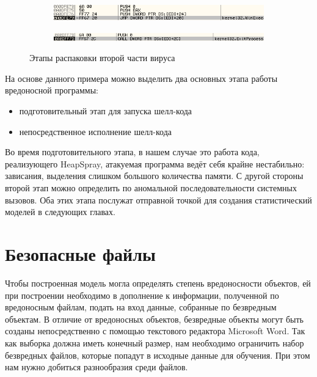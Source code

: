 \begin{figure}[ht]
\begin{subfigure}[h]{0.6\textwidth}
    \end{subfigure}        
    \begin{subfigure}[h]{0.6\textwidth}
    \centering
        \includegraphics[scale=0.7]{1.pdf/pasted-image-41.png}
        \caption{}
        
    \end{subfigure}         
    \begin{subfigure}[h]{0.6\textwidth}
    \centering
        \includegraphics[scale=0.7]{1.pdf/pasted-image-43.png}
        \caption{}
    \end{subfigure}
    \caption{Этапы распаковки второй части вируса}
    \label{fig_parsetree}
\end{figure}

На основе данного примера можно выделить два основных этапа работы вредоносной программы:
\begin{itemize}
\item подготовительный этап для запуска шелл-кода
\item непосредственное исполнение шелл-кода
\end{itemize}

Во время подготовительного этапа, в нашем случае это работа кода, реализующего HeapSpray, атакуемая программа ведёт себя крайне нестабильно: зависания, выделения слишком большого количества памяти.
С другой стороны второй этап можно определить по аномальной последовательности системных вызовов.
Оба этих этапа послужат отправной точкой для создания статистический моделей в следующих главах.

\section{Безопасные файлы}

Чтобы построенная модель могла определять степень вредоносности объектов, ей при построении необходимо в дополнение к информации, полученной по вредоносным файлам, подать на вход данные, собранные по безвредным объектам.
В отличие от вредоносных объектов, безвредные объекты могут быть созданы непосредственно с помощью текстового редактора Microsoft Word.
Так как выборка должна иметь конечный размер, нам необходимо ограничить набор безвредных файлов, которые попадут в исходные данные для обучения.
При этом нам нужно добиться разнообразия среди файлов.

